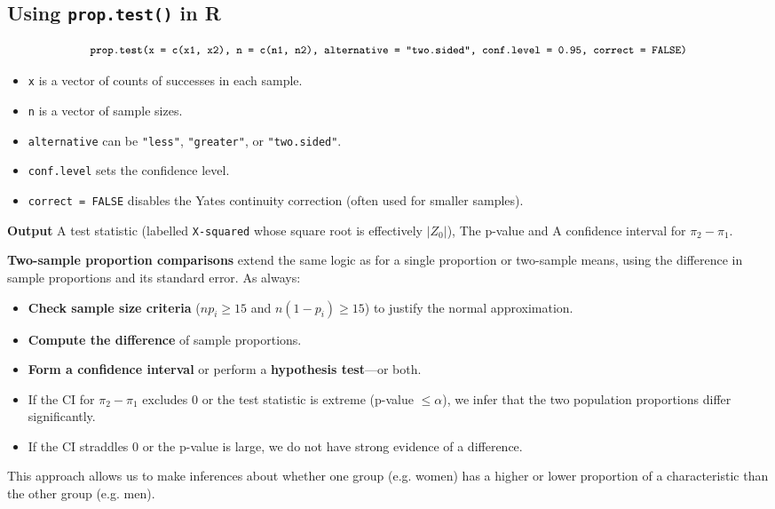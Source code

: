\documentclass[10pt]{extarticle}
\begin{document}
\subsection{Using \texttt{prop.test()} in R}
    $$\small\texttt{prop.test(x = c(x1, x2), n = c(n1, n2), alternative = "two.sided", conf.level = 0.95, correct = FALSE)}$$

\begin{itemize}
    \item \texttt{x} is a vector of counts of successes in each sample.
    \item \texttt{n} is a vector of sample sizes.
    \item \texttt{alternative} can be \texttt{"less"}, \texttt{"greater"}, or \texttt{"two.sided"}.
    \item \texttt{conf.level} sets the confidence level.
    \item \texttt{correct = FALSE} disables the Yates continuity correction (often used for smaller samples).
\end{itemize}

\textbf{Output} A test statistic (labelled \texttt{X-squared} whose square root is effectively $\lvert Z_0\rvert$), The p-value and A confidence interval for $\pi_2 - \pi_1$.

\begin{takeaway-box}{}{}
    \small
    \textbf{Two-sample proportion comparisons} extend the same logic as for a single proportion or two-sample means, using the difference in sample proportions and its standard error. As always:
\begin{itemize}
    \item \textbf{Check sample size criteria} ($n p_i \ge 15$ and $n (1-p_i) \ge 15$) to justify the normal approximation.
    \item \textbf{Compute the difference} of sample proportions.
    \item \textbf{Form a confidence interval} or perform a \textbf{hypothesis test}---or both.
    \item If the CI for $\pi_2 - \pi_1$ excludes 0 or the test statistic is extreme (p-value $\le \alpha$), we infer that the two population proportions differ significantly.
    \item If the CI straddles 0 or the p-value is large, we do not have strong evidence of a difference.
\end{itemize}
    This approach allows us to make inferences about whether one group (e.g. women) has a higher or lower proportion of a characteristic than the other group (e.g. men).
\end{takeaway-box}
\end{document}
